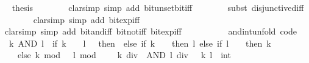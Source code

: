 \begin{isabellebody}
\ \isamarkupfalse%
\ {\isacharquery}{\kern0pt}thesis\isanewline
\ \ \ \ \ \ \isamarkupfalse%
\ {\isacharparenleft}{\kern0pt}clarsimp\ simp\ add{\isacharcolon}{\kern0pt}\ bit{\isacharunderscore}{\kern0pt}unset{\isacharunderscore}{\kern0pt}bit{\isacharunderscore}{\kern0pt}iff{\isacharparenright}{\kern0pt}\isanewline
\ \ \ \ \ \ \isamarkupfalse%
\ {\isacharparenleft}{\kern0pt}subst\ disjunctive{\isacharunderscore}{\kern0pt}diff{\isacharparenright}{\kern0pt}\isanewline
\ \ \ \ \ \ \isamarkupfalse%
\ {\isacharparenleft}{\kern0pt}clarsimp\ simp\ add{\isacharcolon}{\kern0pt}\ bit{\isacharunderscore}{\kern0pt}exp{\isacharunderscore}{\kern0pt}iff{\isacharparenright}{\kern0pt}\isanewline
\ \ \ \ \ \ \isamarkupfalse%
\ {\isacharparenleft}{\kern0pt}clarsimp\ simp\ add{\isacharcolon}{\kern0pt}\ bit{\isacharunderscore}{\kern0pt}and{\isacharunderscore}{\kern0pt}iff\ bit{\isacharunderscore}{\kern0pt}not{\isacharunderscore}{\kern0pt}iff\ bit{\isacharunderscore}{\kern0pt}exp{\isacharunderscore}{\kern0pt}iff{\isacharparenright}{\kern0pt}\isanewline
\ \ \ \ \ \ \isamarkupfalse%
\isanewline
\ \ \isamarkupfalse%
\isanewline
{}\isamarkupfalse%
%
\endisatagproof
{\isafoldproof}%
%
\isadelimproof
\isanewline
%
\endisadelimproof
\isanewline
{}\isamarkupfalse%
\ and{\isacharunderscore}{\kern0pt}int{\isacharunderscore}{\kern0pt}unfold\ {\isacharbrackleft}{\kern0pt}code{\isacharbrackright}{\kern0pt}{\isacharcolon}{\kern0pt}\isanewline
\ \ {\isacartoucheopen}k\ AND\ l\ {\isacharequal}{\kern0pt}\ {\isacharparenleft}{\kern0pt}if\ k\ {\isacharequal}{\kern0pt}\ {}\ {\isasymor}\ l\ {\isacharequal}{\kern0pt}\ {}\ then\ {}\ else\ if\ k\ {\isacharequal}{\kern0pt}\ {\isacharminus}{\kern0pt}\ {}\ then\ l\ else\ if\ l\ {\isacharequal}{\kern0pt}\ {\isacharminus}{\kern0pt}\ {}\ then\ k\isanewline
\ \ \ \ else\ {\isacharparenleft}{\kern0pt}k\ mod\ {}{\isacharparenright}{\kern0pt}\ {\isacharasterisk}{\kern0pt}\ {\isacharparenleft}{\kern0pt}l\ mod\ {}{\isacharparenright}{\kern0pt}\ {\isacharplus}{\kern0pt}\ {}\ {\isacharasterisk}{\kern0pt}\ {\isacharparenleft}{\kern0pt}{\isacharparenleft}{\kern0pt}k\ div\ {}{\isacharparenright}{\kern0pt}\ AND\ {\isacharparenleft}{\kern0pt}l\ div\ {}{\isacharparenright}{\kern0pt}{\isacharparenright}{\kern0pt}{\isacharparenright}{\kern0pt}{\isacartoucheclose}\ \ k\ l\ {\isacharcolon}{\kern0pt}{\isacharcolon}{\kern0pt}\ int\isanewline

\end{isabellebody}
